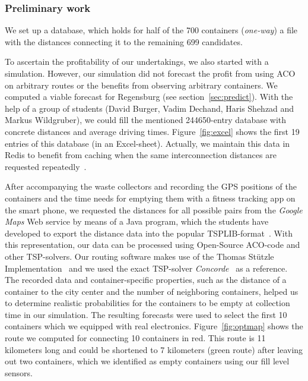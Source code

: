 \documentclass[10pt]{article}
\begin{document}
\subsubsection{Preliminary work}

We set up a database, which holds for half of the 700 containers ({\it one-way})
a file with the distances connecting it to the remaining 699 candidates.%

To ascertain the profitability of our undertakings, we also started with a simulation.
However, our simulation did not forecast the profit from using ACO on arbitrary 
routes or the benefits from observing arbitrary containers. We computed a viable 
forecast for 
Regensburg (see section~\ref{sec:predict}).
With the help of a group of students (David Burger, Vadim Dechand, 
Haris Shehzad and Markus Wildgruber), we could fill the mentioned 
244650-entry database with concrete distances and average driving times. 
Figure~\ref{fig:excel} shows the first 19 entries of this database (in an
Excel-sheet). Actually, we maintain this data in Redis to benefit from caching
when the same interconnection distances are requested repeatedly~\cite{Carlson13}. 

After accompanying
the waste collectors and recording the GPS positions of the containers and the time needs 
for emptying them with a fitness tracking app on the smart phone, we requested the
distances for all possible pairs from the {\it Google Maps} Web service by means of a 
Java program, which the students have developed to export the distance data into the
popular TSPLIB-format~\cite{tsplib90}. With this representation, our data can be 
processed using Open-Source ACO-code and other TSP-solvers. Our routing software makes
use of the Thomas St{\"u}tzle Implementation~\cite{Dorigo97} and we used the exact 
TSP-solver {\it Concorde}~\cite{applegate01} as a reference. 
The recorded data and container-specific properties, such as the distance of
a container to the city center and the number of neighboring containers, helped 
us to determine realistic probabilities for the containers to be empty at collection
time in our simulation. The resulting forecasts were used to select the first 
10 containers which we equipped with real electronics.
Figure~\ref{fig:optmap}
shows the route we computed for connecting 10 containers in red. This route is 
11 kilometers long and could be shortened to 7 kilometers (green route) after
leaving out two containers, which we identified as empty containers using 
our fill level sensors.
\end{document}
